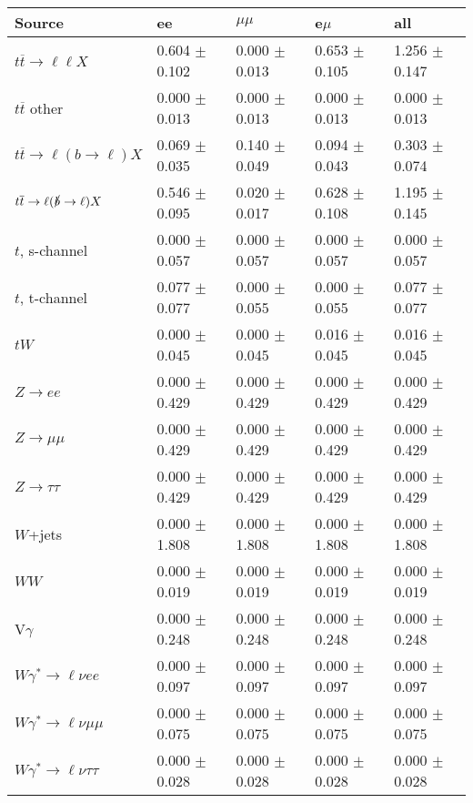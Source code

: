 \begin{tabular}{l | l l l l}
\hline\hline
 Source  &  ee  &  $\mu\mu$  &  e$\mu$  &  all \\
\hline
$t\overline{t}\rightarrow \ell\ell X$ &  0.604 $\pm$  0.102 &  0.000 $\pm$  0.013 &  0.653 $\pm$  0.105 &  1.256 $\pm$  0.147\\
$t\overline{t}$ other &  0.000 $\pm$  0.013 &  0.000 $\pm$  0.013 &  0.000 $\pm$  0.013 &  0.000 $\pm$  0.013\\
$t\overline{t}\rightarrow \ell(b\rightarrow \ell)X$ &  0.069 $\pm$  0.035 &  0.140 $\pm$  0.049 &  0.094 $\pm$  0.043 &  0.303 $\pm$  0.074\\
$t\overline{t}\rightarrow \ell(\slashed{b}\rightarrow \ell)X$ &  0.546 $\pm$  0.095 &  0.020 $\pm$  0.017 &  0.628 $\pm$  0.108 &  1.195 $\pm$  0.145\\
\hline
$t$, s-channel &  0.000 $\pm$  0.057 &  0.000 $\pm$  0.057 &  0.000 $\pm$  0.057 &  0.000 $\pm$  0.057\\
$t$, t-channel &  0.077 $\pm$  0.077 &  0.000 $\pm$  0.055 &  0.000 $\pm$  0.055 &  0.077 $\pm$  0.077\\
$tW$ &  0.000 $\pm$  0.045 &  0.000 $\pm$  0.045 &  0.016 $\pm$  0.045 &  0.016 $\pm$  0.045\\
\hline
$Z\rightarrow ee$ &  0.000 $\pm$  0.429 &  0.000 $\pm$  0.429 &  0.000 $\pm$  0.429 &  0.000 $\pm$  0.429\\
$Z\rightarrow\mu\mu$ &  0.000 $\pm$  0.429 &  0.000 $\pm$  0.429 &  0.000 $\pm$  0.429 &  0.000 $\pm$  0.429\\
$Z\rightarrow\tau\tau$ &  0.000 $\pm$  0.429 &  0.000 $\pm$  0.429 &  0.000 $\pm$  0.429 &  0.000 $\pm$  0.429\\
$W$+jets &  0.000 $\pm$  1.808 &  0.000 $\pm$  1.808 &  0.000 $\pm$  1.808 &  0.000 $\pm$  1.808\\
$WW$ &  0.000 $\pm$  0.019 &  0.000 $\pm$  0.019 &  0.000 $\pm$  0.019 &  0.000 $\pm$  0.019\\
\hline
V$\gamma$ &  0.000 $\pm$  0.248 &  0.000 $\pm$  0.248 &  0.000 $\pm$  0.248 &  0.000 $\pm$  0.248\\
$W\gamma^{*}\rightarrow\ell\nu e e$ &  0.000 $\pm$  0.097 &  0.000 $\pm$  0.097 &  0.000 $\pm$  0.097 &  0.000 $\pm$  0.097\\
$W\gamma^{*}\rightarrow\ell\nu\mu\mu$ &  0.000 $\pm$  0.075 &  0.000 $\pm$  0.075 &  0.000 $\pm$  0.075 &  0.000 $\pm$  0.075\\
$W\gamma^{*}\rightarrow\ell\nu\tau\tau$ &  0.000 $\pm$  0.028 &  0.000 $\pm$  0.028 &  0.000 $\pm$  0.028 &  0.000 $\pm$  0.028\\

\end{tabular}
